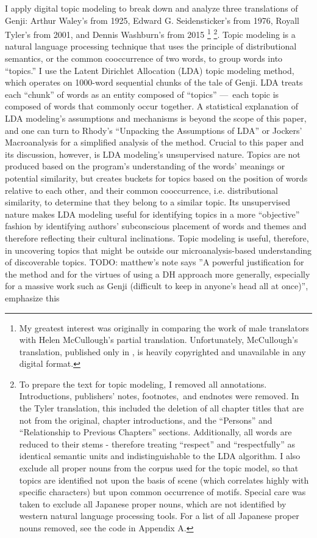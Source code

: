 \documentclass[12pt]{article}
\begin{document}
\begin{flushleft}
\begin{spacing}{2.0}
I apply digital topic modeling to break down and analyze three translations of Genji: Arthur Waley’s from 1925, Edward G. Seidensticker's from 1976, Royall Tyler’s from 2001, and Dennis Washburn’s from 2015 \footnote{ My greatest interest was originally in comparing the work of male translators with Helen McCullough’s partial translation. Unfortunately, McCullough’s translation, published only in , is heavily copyrighted and unavailable in any digital format.} \footnote{ To prepare the text for topic modeling, I removed all annotations. Introductions, publishers’ notes, footnotes, and endnotes were removed. In the Tyler translation, this included the deletion of all chapter titles that are not from the original, chapter introductions, and the ``Persons'' and ``Relationship to Previous Chapters'' sections. Additionally, all words are reduced to their stems - therefore treating ``respect'' and ``respectfully'' as identical semantic units and indistinguishable to the LDA algorithm. I also exclude all proper nouns from the corpus used for the topic model, so that topics are identified not upon the basis of scene (which correlates highly with specific characters) but upon common occurrence of motifs. Special care was taken to exclude all Japanese proper nouns, which are not identified by western natural language processing tools. For a list of all Japanese proper nouns removed, see the code in Appendix A. }. Topic modeling is a natural language processing technique that uses the principle of distributional semantics, or the common cooccurrence of two words, to group words into ``topics.'' I use the Latent Dirichlet Allocation (LDA) topic modeling method, which operates on 1000-word sequential chunks of the tale of Genji. LDA treats each ``chunk'' of words as an entity composed of ``topics'' --- each topic is composed of words that commonly occur together. A statistical explanation of LDA modeling’s assumptions and mechanisms is beyond the scope of this paper, and one can turn to Rhody’s ``Unpacking the Assumptions of LDA'' or Jockers’ Macroanalysis for a simplified analysis of the method. Crucial to this paper and its discussion, however, is LDA modeling’s unsupervised nature. Topics are not produced based on the program’s understanding of the words’ meanings or potential similarity, but creates buckets for topics based on the position of words relative to each other, and their common cooccurrence, i.e. distributional similarity, to determine that they belong to a similar topic. Its unsupervised nature makes LDA modeling useful for identifying topics in a more ``objective'' fashion by identifying authors’ subconscious placement of words and themes and therefore reflecting their cultural inclinations. Topic modeling is useful, therefore, in uncovering topics that might be outside our microanalysis-based understanding of discoverable topics.  TODO: matthew's note says ''A powerful justification for the method and for the virtues of using a DH approach more generally, especially for a massive work such as Genji (difficult to keep in anyone’s head all at once)'', emphasize this


\end{spacing}
\end{flushleft}
\end{document}
